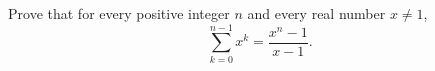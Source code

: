 Prove that for every positive integer $n$ and every real number $x\ne1$,
\[
\sum_{k=0}^{n-1}x^k=\dfrac{x^n-1}{x-1}.
\]
